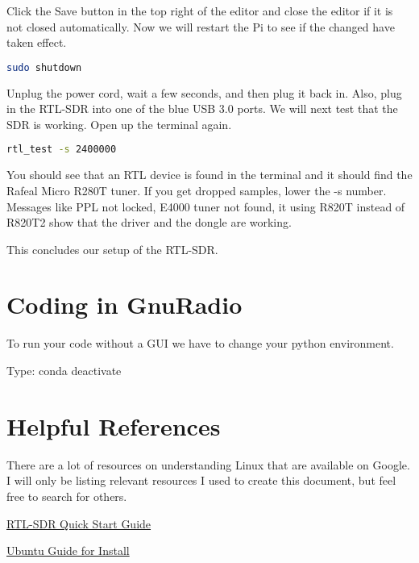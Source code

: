 \documentclass[letterpaper,12pt,notitlepage]{report} %
\begin{document}
Click the Save button in the top right of the editor and close the editor if it is not closed automatically. Now we will restart the Pi to see if the changed have taken effect.

\begin{lstlisting}[language=bash]
	sudo shutdown
\end{lstlisting}

Unplug the power cord, wait a few seconds, and then plug it back in. Also, plug in the RTL-SDR into one of the blue USB 3.0 ports. We will next test that the SDR is working. Open up the terminal again.

\begin{lstlisting}[language=bash]
	rtl_test -s 2400000
\end{lstlisting}

You should see that an RTL device is found in the terminal and it should find the Rafeal Micro R280T tuner. If you get dropped samples, lower the -s number. Messages like PPL not locked, E4000 tuner not found, it using R820T instead of R820T2 show that the driver and the dongle are working.

This concludes our setup of the RTL-SDR. 

\section{Coding in GnuRadio}

To run your code without a GUI we have to change your python environment. 

Type: conda deactivate
\section{Helpful References}
There are a lot of resources on understanding Linux that are available on Google. I will only be listing relevant resources I used to create this document, but feel free to search for others.

\href{https://ranous.files.wordpress.com/2020/05/rtl-sdr4linux_quickstartguidev20.pdf}{RTL-SDR Quick Start Guide}

\href{https://ubuntu.com/tutorials/how-to-install-ubuntu-desktop-on-raspberry-pi-4#1-overview}{Ubuntu Guide for Install}
\end{document}
